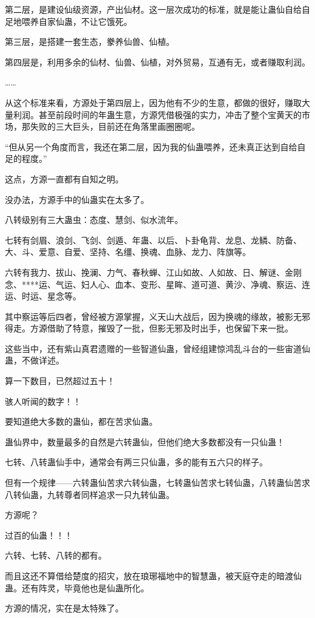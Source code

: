 \begin{this_body}
第二层，是建设仙级资源，产出仙材。这一层次成功的标准，就是能让蛊仙自给自足地喂养自家仙蛊，不让它饿死。

第三层，是搭建一套生态，豢养仙兽、仙植。

第四层是，利用多余的仙材、仙兽、仙植，对外贸易，互通有无，或者赚取利润。

……

从这个标准来看，方源处于第四层上，因为他有不少的生意，都做的很好，赚取大量利润。甚至前段时间的年蛊生意，方源凭借极强的实力，冲击了整个宝黄天的市场，那失败的三大巨头，目前还在角落里画圈圈呢。

“但从另一个角度而言，我还在第二层，因为我的仙蛊喂养，还未真正达到自给自足的程度。”

这点，方源一直都有自知之明。

没办法，方源手中的仙蛊实在太多了。

八转级别有三大蛊虫：态度、慧剑、似水流年。

七转有剑眉、浪剑、飞剑、剑遁、年蛊、以后、卜卦龟背、龙息、龙鳞、防备、大、斗、爱意、自爱、坚持、名缰、换魂、血脉、龙力、阵旗等。

六转有我力、拔山、挽澜、力气、春秋蝉、江山如故、人如故、日、解谜、金刚念、****运、气运、妇人心、血本、变形、星眸、道可道、黄沙、净魂、察运、连运、时运、星念等。

其中察运等后四者，曾经被方源掌握，义天山大战后，因为换魂的缘故，被影无邪得走。方源借助了特意，摧毁了一批，但影无邪及时出手，也保留下来一批。

这些当中，还有紫山真君遗赠的一些智道仙蛊，曾经组建惊鸿乱斗台的一些宙道仙蛊，不做详述。

算一下数目，已然超过五十！

骇人听闻的数字！！

要知道绝大多数的蛊仙，都在苦求仙蛊。

蛊仙界中，数量最多的自然是六转蛊仙，但他们绝大多数都没有一只仙蛊！

七转、八转蛊仙手中，通常会有两三只仙蛊，多的能有五六只的样子。

但有一个规律——六转蛊仙苦求六转仙蛊，七转蛊仙苦求七转仙蛊，八转蛊仙苦求八转仙蛊，九转尊者同样追求一只九转仙蛊。

方源呢？

过百的仙蛊！！！

六转、七转、八转的都有。

而且这还不算借给楚度的招灾，放在琅琊福地中的智慧蛊，被天庭夺走的暗渡仙蛊。还有阵灵，毕竟他也是仙蛊所化。

方源的情况，实在是太特殊了。


\end{this_body}
